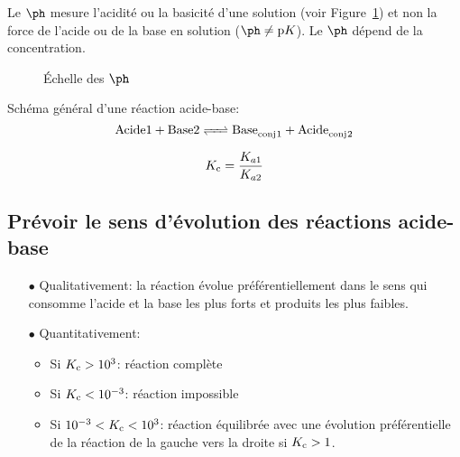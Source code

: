 Le $\ph$ mesure l'acidité ou la basicité d'une solution (voir Figure~\ref{fig:ph_scale}) et non la force de l'acide ou de la base en solution ($\ph \neq \mathrm{p}K$).
Le $\ph$ dépend de la concentration.
\begin{figure}[ht!]
  \begin{center}
  \end{center}
  \caption{Échelle des $\ph$}
  \label{fig:ph_scale}
\end{figure}

Schéma général d'une réaction acide-base:
\[ \ce{Acide 1 + Base 2 <=> Base_{conj}1 + Acide_{conj}2} \]

$$K_{\mathrm{c}}=\frac{K_{a1}}{K_{a2}}$$

\subsection{Prévoir le sens d'évolution des réactions acide-base}

\begin{itemize}
  \item[$\bullet$] Qualitativement: la réaction évolue préférentiellement dans le sens qui consomme l'acide et la base les plus forts et produits les plus faibles.
  \item[$\bullet$] Quantitativement:
    \begin{itemize}
      \item Si $K_{\mathrm{c}}>10^3$: réaction complète
      \item Si $K_{\mathrm{c}}<10^{-3}$: réaction impossible
      \item Si $10^{-3}<K_{\mathrm{c}}<10^3$: réaction équilibrée avec une évolution préférentielle de la réaction de la gauche vers la droite si $K_{\mathrm{c}}>1$.
    \end{itemize}
\end{itemize}


